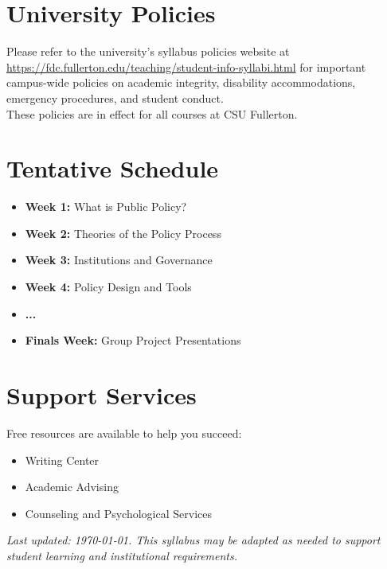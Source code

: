 \documentclass[11pt]{article}
\begin{document}
\section*{University Policies}
Please refer to the university’s syllabus policies website at
\url{https://fdc.fullerton.edu/teaching/student-info-syllabi.html} for important campus-wide policies on academic integrity, disability accommodations, emergency procedures, and student conduct.\\
These policies are in effect for all courses at CSU Fullerton.

\section*{Tentative Schedule}
\begin{itemize}[leftmargin=1.5em]
  \item \textbf{Week 1:} What is Public Policy?
  \item \textbf{Week 2:} Theories of the Policy Process
  \item \textbf{Week 3:} Institutions and Governance
  \item \textbf{Week 4:} Policy Design and Tools
  \item \textbf{...}
  \item \textbf{Finals Week:} Group Project Presentations
\end{itemize}

\section*{Support Services}
Free resources are available to help you succeed:
\begin{itemize}[leftmargin=1.5em]
  \item Writing Center
  \item Academic Advising
  \item Counseling and Psychological Services
\end{itemize}

\vfill
\noindent\textit{Last updated: \today. This syllabus may be adapted as needed to support student learning and institutional requirements.}
\end{document}
